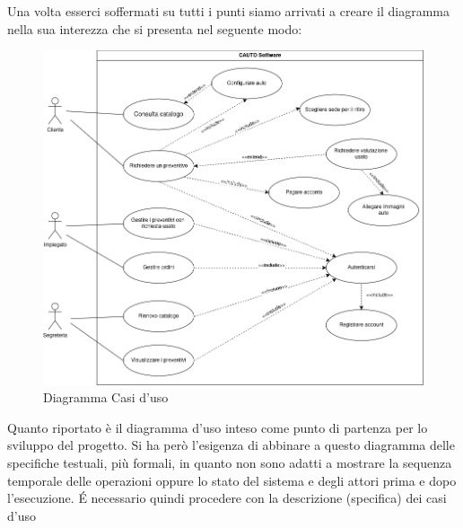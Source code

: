 \documentclass[a4paper, 11pt,oneside,]{book}
\newcommand{\spacing}{\par\bigskip\noindent}
\begin{document}
        Una volta esserci soffermati su tutti i punti siamo arrivati a creare il diagramma nella sua interezza che si presenta nel seguente modo:
        \begin{figure}[H]
            \includegraphics[width=\textwidth]{Diagramma_casi_d'uso.png}
            \caption{Diagramma Casi d'uso}
            \label{fig:diagramma_casi_d'uso}
        \end{figure}
        \spacing
        Quanto riportato è il diagramma d'uso inteso come punto di partenza per lo sviluppo del progetto. Si ha però l'esigenza di abbinare a questo
        diagramma delle specifiche testuali, più formali, in quanto non sono adatti a mostrare la sequenza temporale delle operazioni oppure lo stato del
        sistema e degli attori prima e dopo l'esecuzione. \'E necessario quindi procedere con la descrizione (specifica) dei casi d'uso
\end{document}
